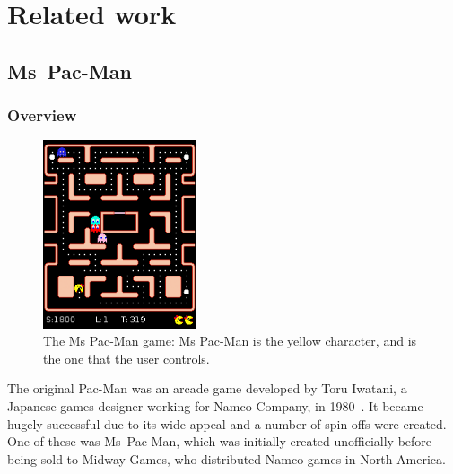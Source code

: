 \chapter{Related work}
\label{ch:related}


\section{Ms~Pac-Man}

\subsection{Overview}

\begin{figure}[ht]
\centering
\includegraphics[width=0.4\textwidth]{diagrams/pac-man}
\caption[The Ms Pac-Man game]{The Ms Pac-Man game: Ms Pac-Man is the yellow character, and is the one that the user controls.}
\label{fig:pac-man}
\end{figure}

The original Pac-Man was an arcade game developed by Toru Iwatani, a Japanese games designer working for Namco Company, in 1980~\citep{Samothrakis2011}.  It became hugely successful due to its wide appeal and a number of spin-offs were created.  One of these was Ms~Pac-Man, which was initially created unofficially before being sold to Midway Games, who distributed Namco games in North America.

